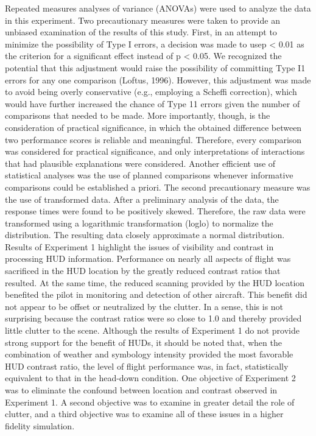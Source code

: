 \documentclass[utf8,bachelor,manualbib]{gradu3}
\begin{document}
Repeated measures analyses of variance (ANOVAs) were used to analyze the data
in this experiment. Two precautionary measures were taken to provide an unbiased
examination of the results of this study. First, in an attempt to minimize the
possibility of Type I errors, a decision was made to usep < 0.01 as the criterion for
a significant effect instead of p < 0.05. We recognized the potential that this
adjustment would raise the possibility of committing Type I1 errors for any one
comparison (Loftus, 1996). However, this adjustment was made to avoid being
overly conservative (e.g., employing a Scheffi correction), which would have
further increased the chance of Type 11 errors given the number of comparisons that
needed to be made. More importantly, though, is the consideration of practical
significance, in which the obtained difference between two performance scores is
reliable and meaningful. Therefore, every comparison was considered for practical
significance, and only interpretations of interactions that had plausible explanations
were considered. Another efficient use of statistical analyses was the use of planned
comparisons whenever informative comparisons could be established a priori. The
second precautionary measure was the use of transformed data. After a preliminary
analysis of the data, the response times were found to be positively skewed.
Therefore, the raw data were transformed using a logarithmic transformation (loglo)
to normalize the distribution. The resulting data closely approximate a normal
distribution.
Results of Experiment 1 highlight the issues of visibility and contrast in
processing HUD information. Performance on nearly all aspects of flight was
sacrificed in the HUD location by the greatly reduced contrast ratios that resulted.
At the same time, the reduced scanning provided by the HUD location benefited
the pilot in monitoring and detection of other aircraft. This benefit did not appear
to be offset or neutralized by the clutter. In a sense, this is not surprising because
the contrast ratios were so close to 1.0 and thereby provided little clutter to the
scene.
Although the results of Experiment 1 do not provide strong support for the
benefit of HUDs, it should be noted that, when the combination of weather and
symbology intensity provided the most favorable HUD contrast ratio, the level of
flight performance was, in fact, statistically equivalent to that in the head-down
condition. One objective of Experiment 2 was to eliminate the confound between
location and contrast observed in Experiment 1. A second objective was to examine
in greater detail the role of clutter, and a third objective was to examine all of these
issues in a higher fidelity simulation. \citep{ververs1998}
\end{document}
